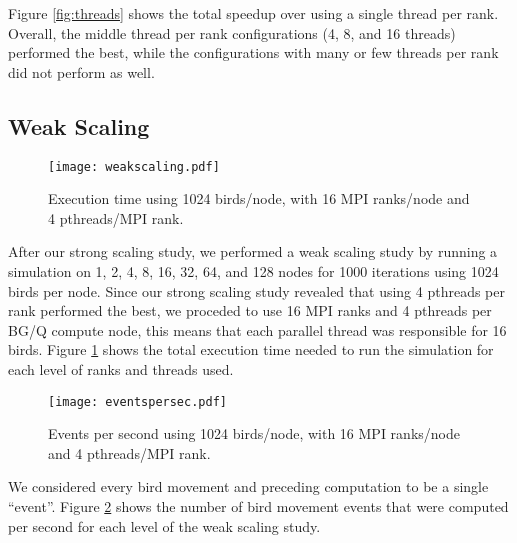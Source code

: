 Figure \ref{fig:threads} shows the total speedup over using a single thread per rank.
Overall, the middle thread per rank configurations (4, 8, and 16 threads)
performed the best, while the configurations with many or few threads per rank did
not perform as well.

\subsection*{Weak Scaling}
\FloatBarrier
\begin{figure}[h!]
  \centering
  \texttt{[image: weakscaling.pdf]}
  \caption{Execution time using 1024 birds/node, with 16 MPI ranks/node and 4 pthreads/MPI rank.\label{fig:weakscaling}}
\end{figure}

After our strong scaling study, we performed a weak scaling study by running a
simulation on 1, 2, 4, 8, 16, 32, 64, and 128 nodes for 1000 iterations using
1024 birds per node. Since our strong scaling study revealed that using 4 pthreads
per rank performed the best, we proceded to use 16 MPI ranks and 4 pthreads per
BG/Q compute node, this means that each parallel thread was responsible for 16
birds. Figure \ref{fig:weakscaling} shows the total execution time
needed to run the simulation for each level of ranks and threads used.

\begin{figure}[h!]
  \centering
  \texttt{[image: eventspersec.pdf]}
  \caption{Events per second using 1024 birds/node, with 16 MPI ranks/node and 4 pthreads/MPI rank.\label{fig:eventspersec}}
\end{figure}

We considered every bird movement and preceding computation to be a single ``event''.
Figure \ref{fig:eventspersec} shows the number of bird movement events that were
computed per second for each level of the weak scaling study.
